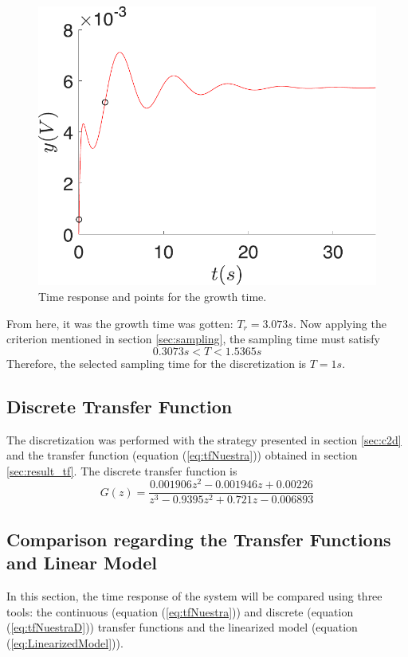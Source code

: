   \begin{figure}[ht]%
      \centering
      \includegraphics[scale=0.4]{figs/Growth_time.pdf}
      \caption{Time response and points for the growth time.}
      \label{fig:growth_Time}
  \end{figure}
  
  From here, it was the growth time was gotten: $T_r=3.073s$. Now applying the criterion mentioned in section \ref{sec:sampling}, the sampling time must satisfy
  \begin{equation}
      0.3073s<T<1.5365s
  \end{equation}
  Therefore, the selected sampling time for the discretization is $T=1s$.
 
 
 \subsection{Discrete Transfer Function}
 The discretization was performed with the strategy presented in section \ref{sec:c2d} and the transfer function (equation (\ref{eq:tfNuestra})) obtained in section \ref{sec:result_tf}. The discrete transfer function is
 \begin{equation}\label{eq:tfNuestraD}
    G(z)=\dfrac{0.001906z^2-0.001946z+0.00226}{z^3-0.9395z^2+0.721z-0.006893}
 \end{equation}
 
 \subsection{Comparison regarding the Transfer Functions and Linear Model}
 In this section, the time response of the system will be compared using three tools: the continuous (equation (\ref{eq:tfNuestra})) and discrete (equation (\ref{eq:tfNuestraD})) transfer functions and the linearized model (equation (\ref{eq:LinearizedModel})). 
 
